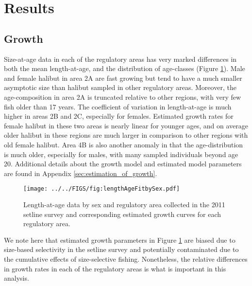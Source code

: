 \section*{Results} %
\label{sec:results}

\subsection*{Growth} %
\label{sub:growth}

Size-at-age data in each of the regulatory areas has very marked differences in both the mean length-at-age, and the distribution of age-classes (Figure \ref{fig:FIGS_fig:lengthAgeFitbySex}). Male and female halibut in area 2A are fast growing but tend to have a much smaller asymptotic size than halibut sampled in other regulatory areas.  Moreover, the age-composition in area 2A is truncated relative to other regions, with very few fish older than 17 years.  The coefficient of variation in length-at-age is much higher in areas 2B and 2C, especially for females.  Estimated growth rates for female halibut in these two areas is nearly linear for younger ages, and on average older halibut in these regions are much larger in comparison to other regions with old female halibut.  Area 4B is also another anomaly in that the age-distribution is much older, especially for males, with many sampled individuals beyond age 20.  Additional details about the growth model and estimated model parameters are found in Appendix \ref{sec:estimation_of_growth}.

\begin{figure}[htbp]
	\centering
		\texttt{[image: ../../FIGS/fig:lengthAgeFitbySex.pdf]}
	\caption{Length-at-age data by sex and regulatory area collected in the 2011 setline survey and corresponding estimated growth curves for each regulatory area.}
	\label{fig:FIGS_fig:lengthAgeFitbySex}
\end{figure}

We note here that estimated growth parameters in Figure \ref{fig:FIGS_fig:lengthAgeFitbySex} are biased due to size-based selectivity in the setline survey and potentially contaminated due to the cumulative effects of size-selective fishing.  Nonetheless, the relative differences in growth rates in each of the regulatory areas is what is important in this analysis.


